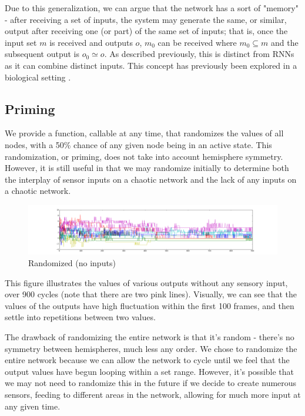 \documentclass[12pt]{article}
\begin{document}
Due to this generalization, we can argue that the network has a sort of "memory" - after receiving a set of inputs, the system may generate the same, or similar, output after receiving one (or part) of the same set of inputs; that is, once the input set $m$ is received and outputs $o$, $m_0$ can be received where $m_0 \subseteq m$ and the subsequent output is $o_0 \simeq o$.  As described previously, this is distinct from RNNs as it can combine distinct inputs.  This concept has previously been explored in a biological setting \cite{synapsememory}.

\subsection{Priming}

We provide a function, callable at any time, that randomizes the values of all nodes, with a 50\% chance of any given node being in an active state.  This randomization, or priming, does not take into account hemisphere symmetry.  However, it is still useful in that we may randomize initially to determine both the interplay of sensor inputs on a chaotic network and the lack of any inputs on a chaotic network.

\begin{figure}[H]
    \includegraphics[width=\linewidth]{../visualizations/8knodes_stable_line.png}
    \caption{Randomized (no inputs)}
\end{figure}

This figure illustrates the values of various outputs without any sensory input, over 900 cycles (note that there are two pink lines).  Visually, we can see that the values of the outputs have high fluctuation within the first 100 frames, and then settle into repetitions  between two values.

The drawback of randomizing the entire network is that it's random - there's no symmetry between hemispheres, much less any order.  We chose to randomize the entire network because we can allow the network to cycle until we feel that the output values have begun looping within a set range.  However, it's possible that we may not need to randomize this in the future if we decide to create numerous sensors, feeding to different areas in the network, allowing for much more input at any given time.
\end{document}
